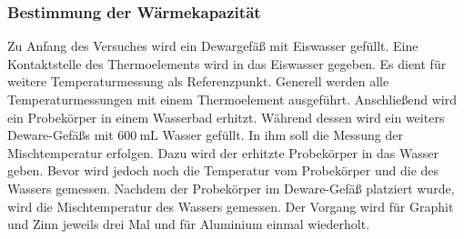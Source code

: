\subsubsection{Bestimmung der Wärmekapazität}
Zu Anfang des Versuches wird ein Dewargefäß mit Eiswasser gefüllt.
Eine Kontaktstelle des Thermoelements wird in das Eiswasser gegeben.
Es dient für weitere Temperaturmessung als Referenzpunkt.
Generell werden alle Temperaturmessungen mit einem Thermoelement ausgeführt.
Anschließend wird ein Probekörper in einem Wasserbad erhitzt.
Während dessen wird ein weiters Deware-Gefäßs mit $\SI{600}{\milli\liter}$ Wasser gefüllt.
In ihm soll die Messung der Mischtemperatur erfolgen.
Dazu wird der erhitzte Probekörper in das Wasser geben.
Bevor wird jedoch noch die Temperatur vom Probekörper und die des Wassers gemessen.
Nachdem der Probekörper im Deware-Gefäß platziert wurde, wird die Mischtemperatur des
Wassers gemessen. Der Vorgang wird für Graphit und Zinn jeweils drei Mal und für
Aluminium einmal wiederholt.

